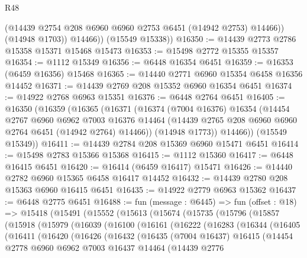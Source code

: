 \begin{lexlean}{R48}
\begin{coremodule}
              (@14439 @2754 @208 @6960 @6960 @2753 @6451 (@14942 @2753) @14466))
            (@14948 @1703))
          @14466))
      (@15549 @15338))
@16350 := @14439 @2773 @2786 @15358 @15371 @15468 @15473
@16353 := @15498 @2772 @15355 @15357
@16354 := @1112 @15349
@16356 := @6448 @16354 @6451
@16359 := @16353 (@6459 @16356) @15468
@16365 := @14440 @2771 @6960 @15354 @6458 @16356 @14452
@16371 := @14439 @2769 @208 @15352 @6960 @16354 @6451
@16374 := @14922 @2768 @6963 @15351
@16376 := @6448 @2764 @6451
@16405 := @16350
    (@16359
      (@16365
        (@16371
          (@16374
            (@7004 @16376)
            @16354
            (@14454
              @2767
              @6960
              @6962
              @7003
              @16376
              @14464
              (@14439 @2765 @208 @6960 @6960 @2764 @6451 (@14942 @2764) @14466))
            (@14948 @1773))
          @14466))
      (@15549 @15349))
@16411 := @14439 @2784 @208 @15369 @6960 @15471 @6451
@16414 := @15498 @2783 @15366 @15368
@16415 := @1112 @15360
@16417 := @6448 @16415 @6451
@16420 := @16414 (@6459 @16417) @15471
@16426 := @14440 @2782 @6960 @15365 @6458 @16417 @14452
@16432 := @14439 @2780 @208 @15363 @6960 @16415 @6451
@16435 := @14922 @2779 @6963 @15362
@16437 := @6448 @2775 @6451
@16488 := fun (message : @6445) =>
  fun (offset : @18) =>
  @15418
    (@15491
      (@15552
        (@15613
          (@15674
            (@15735
              (@15796
                (@15857
                  (@15918
                    (@15979
                      (@16039
                        (@16100
                          (@16161
                            (@16222
                              (@16283
                                (@16344
                                  (@16405
                                    (@16411
                                      (@16420
                                        (@16426
                                          (@16432
                                            (@16435
                                              (@7004 @16437)
                                              @16415
                                              (@14454
                                                @2778
                                                @6960
                                                @6962
                                                @7003
                                                @16437
                                                @14464
                                                (@14439
                                                  @2776

\end{coremodule}
\end{lexlean}
